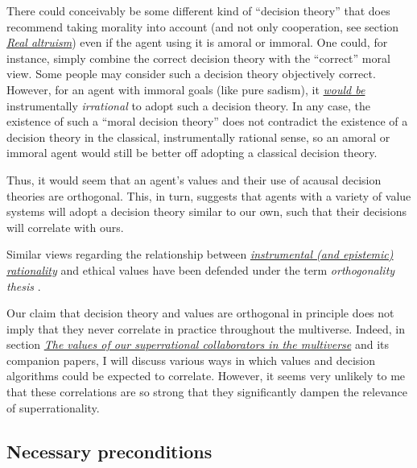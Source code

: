 There could conceivably be some different kind of ``decision theory''
that does recommend taking morality into account (and not only
cooperation, see section \protect\hyperlink{real-altruism}{\emph{Real
altruism}}) even if the agent using it is amoral or immoral. One
could, for instance, simply combine the correct decision theory with the
``correct'' moral view. Some people may consider such a decision theory
objectively correct. However, for an agent with immoral goals (like pure
sadism), it
\href{http://reducing-suffering.org/thoughts-on-postmodernism-and-its-intellectual-kin/\#Why_care_about_ethics}{\emph{would
be}} instrumentally \emph{irrational} to adopt such a decision theory.
In any case, the existence of such a ``moral decision theory'' does not
contradict the existence of a decision theory in the classical,
instrumentally rational sense, so an amoral or immoral agent would still
be better off adopting a classical decision theory.

Thus, it would seem that an agent's values and their use of acausal
decision theories are orthogonal. This, in turn, suggests that agents
with a variety of value systems will adopt a decision theory similar to
our own, such that their decisions will correlate with ours.

Similar views regarding the relationship between
\href{http://lesswrong.com/lw/31/what_do_we_mean_by_rationality/}{\emph{instrumental
(and epistemic) rationality}} and ethical values have been defended
under the term \emph{orthogonality thesis}
\parencite{Bostrom2014-pc,Bostrom2012-hj,Armstrong2013-xo}.

Our claim that decision theory and values are orthogonal in principle
does not imply that they never correlate in practice throughout the
multiverse. Indeed, in section
\protect\hyperlink{the-values-of-our-superrational-collaborators-in-the-multiverse}{\emph{The
values of our superrational collaborators in the multiverse}} and its
companion papers, I will discuss various ways in which values and
decision algorithms could be expected to correlate. However, it seems
very unlikely to me that these correlations are so strong that they
significantly dampen the relevance of superrationality.

\hypertarget{necessary-preconditions}{\subsection{Necessary
preconditions}\label{necessary-preconditions}}

